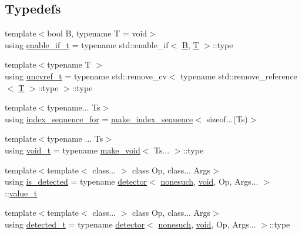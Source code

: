 \subsection*{Typedefs}
\begin{DoxyCompactItemize}
\item 
{\footnotesize template$<$bool B, typename T  = void$>$ }\\using \mbox{\hyperlink{namespacenlohmann_1_1detail_a02bcbc878bee413f25b985ada771aa9c}{enable\+\_\+if\+\_\+t}} = typename std\+::enable\+\_\+if$<$ \mbox{\hyperlink{_keyboard_event_8h_a9d3d9048db16a7eee539e93e3618cbe7}{B}}, \mbox{\hyperlink{_keyboard_event_8h_adf1f3edb9115acb0a1e04209b7a9937b}{T}} $>$\+::type
\item 
{\footnotesize template$<$typename T $>$ }\\using \mbox{\hyperlink{namespacenlohmann_1_1detail_a53a082eedad9f4729fcd8fed552a21f7}{uncvref\+\_\+t}} = typename std\+::remove\+\_\+cv$<$ typename std\+::remove\+\_\+reference$<$ \mbox{\hyperlink{_keyboard_event_8h_adf1f3edb9115acb0a1e04209b7a9937b}{T}} $>$\+::type $>$\+::type
\item 
{\footnotesize template$<$typename... Ts$>$ }\\using \mbox{\hyperlink{namespacenlohmann_1_1detail_a24800493c6ec02ce033dcbb47b7fd28e}{index\+\_\+sequence\+\_\+for}} = \mbox{\hyperlink{structnlohmann_1_1detail_1_1make__index__sequence}{make\+\_\+index\+\_\+sequence}}$<$ sizeof...(Ts)$>$
\item 
{\footnotesize template$<$typename ... Ts$>$ }\\using \mbox{\hyperlink{namespacenlohmann_1_1detail_a92a167c49c6697b6ffe4f79492c705e5}{void\+\_\+t}} = typename \mbox{\hyperlink{structnlohmann_1_1detail_1_1make__void}{make\+\_\+void}}$<$ Ts... $>$\+::type
\item 
{\footnotesize template$<$template$<$ class... $>$ class Op, class... Args$>$ }\\using \mbox{\hyperlink{namespacenlohmann_1_1detail_a9135fcf616d6ac6e231a86e0a055ac44}{is\+\_\+detected}} = typename \mbox{\hyperlink{structnlohmann_1_1detail_1_1detector}{detector}}$<$ \mbox{\hyperlink{structnlohmann_1_1detail_1_1nonesuch}{nonesuch}}, \mbox{\hyperlink{namespacenlohmann_1_1detail_a59fca69799f6b9e366710cb9043aa77d}{void}}, Op, Args... $>$\+::\mbox{\hyperlink{namespacenlohmann_1_1detail_a1ed8fc6239da25abcaf681d30ace4985}{value\+\_\+t}}
\item 
{\footnotesize template$<$template$<$ class... $>$ class Op, class... Args$>$ }\\using \mbox{\hyperlink{namespacenlohmann_1_1detail_a37e97a32d0b94ce5f745427e4e40204d}{detected\+\_\+t}} = typename \mbox{\hyperlink{structnlohmann_1_1detail_1_1detector}{detector}}$<$ \mbox{\hyperlink{structnlohmann_1_1detail_1_1nonesuch}{nonesuch}}, \mbox{\hyperlink{namespacenlohmann_1_1detail_a59fca69799f6b9e366710cb9043aa77d}{void}}, Op, Args... $>$\+::type

\end{DoxyCompactItemize}

